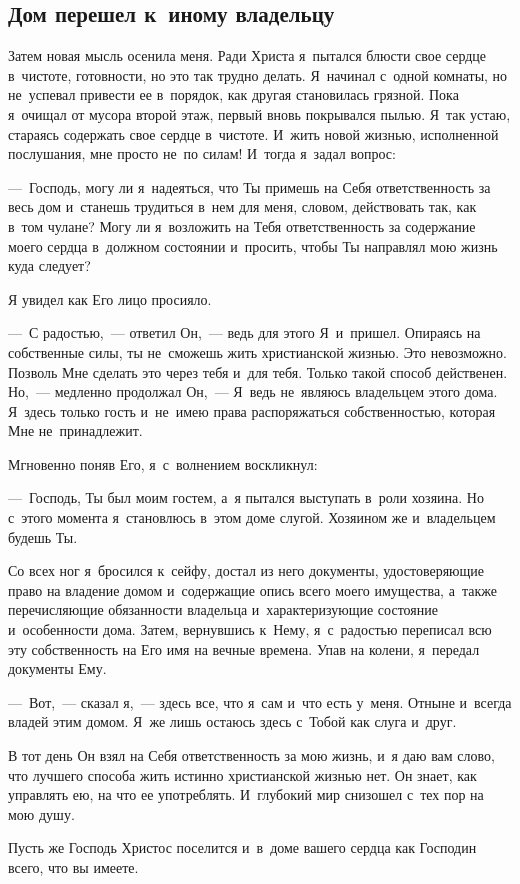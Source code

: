 \documentclass[12pt,article,a4paper,fittopage]{ncc}
\begin{document}
\begin{multicols}{2}
\section*{Дом перешел к~иному владельцу}

Затем новая мысль осенила меня. Ради Христа я~пытался блюсти свое сердце в~чистоте, готовности, но это так трудно делать. Я~начинал с~одной комнаты, но не~успевал привести ее в~порядок, как другая становилась грязной. Пока я~очищал от мусора второй этаж, первый вновь покрывался пылью. Я~так устаю, стараясь содержать свое сердце в~чистоте. И~жить новой жизнью, исполненной послушания, мне просто не~по силам! И~тогда я~задал вопрос: 

---~Господь, могу ли я~надеяться, что Ты примешь на Себя ответственность за весь дом и~станешь трудиться в~нем для меня, словом, действовать так, как в~том чулане? Могу ли я~возложить на Тебя ответственность за содержание моего сердца в~должном состоянии и~просить, чтобы Ты направлял мою жизнь куда следует?

Я увидел как Его лицо просияло. 

---~С радостью,~--- ответил Он,~--- ведь для этого Я~и~пришел. Опираясь на собственные силы, ты не~сможешь жить христианской жизнью. Это невозможно. Позволь Мне сделать это через тебя и~для тебя. Только такой способ действенен. Но,~--- медленно продолжал Он,~--- Я~ведь не~являюсь владельцем этого дома. Я~здесь только гость и~не~имею права распоряжаться собственностью, которая Мне не~принадлежит.

Мгновенно поняв Его, я~с~волнением воскликнул: 

---~Господь, Ты был моим гостем, а~я пытался выступать в~роли хозяина. Но с~этого момента я~становлюсь в~этом доме слугой. Хозяином же и~владельцем будешь Ты. 

Со всех ног я~бросился к~сейфу, достал из него документы, удостоверяющие право на владение домом и~содержащие опись всего моего имущества, а~также перечисляющие обязанности владельца и~характеризующие состояние и~особенности дома. Затем, вернувшись к~Нему, я~с~радостью переписал всю эту собственность на Его имя на вечные времена. Упав на колени, я~передал документы Ему. 

---~Вот,~--- сказал я,~--- здесь все, что я~сам и~что есть у~меня. Отныне и~всегда владей этим домом. Я~же лишь остаюсь здесь с~Тобой как слуга и~друг.

В тот день Он взял на Себя ответственность за мою жизнь, и~я даю вам слово, что лучшего способа жить истинно христианской жизнью нет. Он знает, как управлять ею, на что ее употреблять. И~глубокий мир снизошел с~тех пор на мою душу. 

Пусть же Господь Христос поселится и~в~доме вашего сердца как Господин всего, что вы имеете.
\thispagestyle{lheadings}
\end{multicols}
\end{document}

